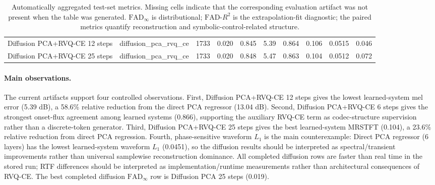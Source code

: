 \begin{table}[t]
\begin{tabular}{llrrrrrrrr}
Diffusion PCA+RVQ-CE 12 steps & diffusion\_pca\_rvq\_ce & 1733 & 0.020 & 0.845 & 5.39 & 0.864 & 0.106 & 0.0515 & 0.046 \\
Diffusion PCA+RVQ-CE 25 steps & diffusion\_pca\_rvq\_ce & 1733 & 0.020 & 0.848 & 5.47 & 0.863 & 0.104 & 0.0512 & 0.072 \\
\bottomrule
\end{tabular}
\caption{Automatically aggregated test-set metrics. Missing cells indicate that the corresponding evaluation artifact was not present when the table was generated. $\mathrm{FAD}_{\infty}$ is distributional; $\mathrm{FAD}\text{-}R^2$ is the extrapolation-fit diagnostic; the paired metrics quantify reconstruction and symbolic-control-related structure.}
\label{tab:auto_main_results}
\end{table}

\paragraph{Main observations.}
The current artifacts support four controlled observations.
First, Diffusion PCA+RVQ-CE 12 steps gives the lowest learned-system mel error (5.39 dB), a 58.6\% relative reduction from the direct PCA regressor (13.04 dB).
Second, Diffusion PCA+RVQ-CE 6 steps gives the strongest onset-flux agreement among learned systems (0.866), supporting the auxiliary RVQ-CE term as codec-structure supervision rather than a discrete-token generator.
Third, Diffusion PCA+RVQ-CE 25 steps gives the best learned-system MRSTFT (0.104), a 23.6\% relative reduction from direct PCA regression.
Fourth, phase-sensitive waveform $L_1$ is the main counterexample: Direct PCA regressor (6 layers) has the lowest learned-system waveform $L_1$ (0.0451), so the diffusion results should be interpreted as spectral/transient improvements rather than universal samplewise reconstruction dominance.
All completed diffusion rows are faster than real time in the stored run; RTF differences should be interpreted as implementation/runtime measurements rather than architectural consequences of RVQ-CE.
The best completed diffusion $\mathrm{FAD}_{\infty}$ row is Diffusion PCA 25 steps (0.019).
